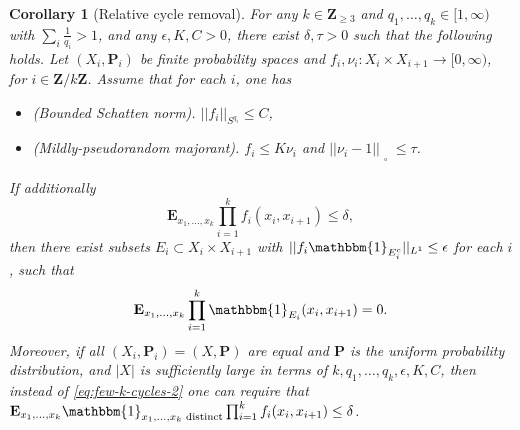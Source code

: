 \documentclass[reqno,11pt]{amsart}
\newtheorem{corollary}[theorem]{Corollary}
\theoremstyle{definition}
\theoremstyle{remark}
\numberwithin{equation}{section}
\newcommand{\Z}{\mathbf{Z}}
\renewcommand{\P}{\mathbf{P}}
\newcommand{\E}{\mathbf{E}}
\newcommand{\one}{\mathbbm{1}}
\newcommand{\sq}{_{\substack{ \\ \square}}}
\begin{document}
\begin{corollary}[Relative cycle removal] \label{cor:relative-k-cycle-removal}
For any $k \in \Z_{\ge 3}$ and $q_1, \ldots, q_k \in [1, \infty)$ with $\sum_i \frac{1}{q_i} > 1$, and any $\epsilon, K, C > 0$, there exist $\delta, \tau > 0$ such that the following holds.
Let $(X_i, \P_i)$ be finite probability spaces and $f_{i}, \nu_{i} : X_i \times X_{i+1} \to [0, \infty)$, for $i \in \Z/k\Z$. Assume that for each $i$, one has
\begin{itemize}
    \item[$(i)$] \emph{(Bounded Schatten norm).} $||f_{i}||_{S^{q_i}} \le C$,
    \item[$(ii)$] \emph{(Mildly-pseudorandom majorant).} $f_i \le K\nu_i$ and $||\nu_i - 1||\sq \le \tau$.
\end{itemize}
If additionally
\begin{equation} \label{eq:few-k-cycles-2}
    \E_{x_1, \ldots, x_k} \prod_{i=1}^k f_{i}(x_i,x_{i+1}) \le \delta,
\end{equation}
then there exist subsets $E_{i} \subset X_i \times X_{i+1}$ with $||f_{i} \one_{E_{i}^c}||_{L^1} \le \epsilon$ for each $i$, such that
\[
    \E_{x_1, \ldots, x_k} \prod_{i=1}^k \one_{E_{i}}(x_i,x_{i+1}) = 0.
\]
Moreover, if all $(X_i, \P_i) = (X, \P)$ are equal and $\P$ is the uniform probability distribution, and $|X|$ is sufficiently large in terms of $k,q_1,\ldots,q_k,\epsilon,K,C$, then instead of \cref{eq:few-k-cycles-2} one can require that $\E_{x_1, \ldots, x_k} \one_{x_1,\ldots,x_k\textnormal{ distinct}} \prod_{i=1}^k f_{i}(x_i,x_{i+1}) \le \delta$.
\end{corollary}
\end{document}
